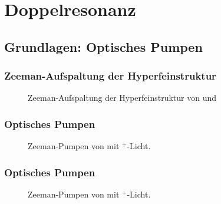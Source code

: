 
\section{Doppelresonanz}
\subsection{Grundlagen: Optisches Pumpen}


\begin{frame}
\frametitle{Zeeman-Aufspaltung der Hyperfeinstruktur}


\begin{figure}
    \centering
    \def\svgwidth{\textwidth}
    
    \caption{Zeeman-Aufspaltung der Hyperfeinstruktur von  und }
\end{figure}

\end{frame}



\begin{frame}
\frametitle{Optisches Pumpen}

\begin{figure}
   \centering
    \def\svgwidth{\textwidth}
    
    \caption{Zeeman-Pumpen von  mit \textsigma$^+$-Licht.}
\end{figure}

\end{frame}




\begin{frame}[noframenumbering]
\frametitle{Optisches Pumpen}

\begin{figure}
   \centering
    \def\svgwidth{\textwidth}
    
    \caption{Zeeman-Pumpen von  mit \textsigma$^+$-Licht.}
\end{figure}

\end{frame}


